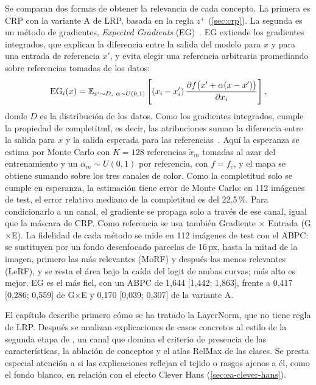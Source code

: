 Se comparan dos formas de obtener la relevancia de cada concepto. La primera es CRP con la variante A de LRP, basada en la regla $z^{+}$ (\cref{sec:crp}). La segunda es un método de gradientes, \emph{Expected Gradients} (EG)~\cite{erion2020}. EG extiende los gradientes integrados, que explican la diferencia entre la salida del modelo para $x$ y para una entrada de referencia $x'$, y evita elegir una referencia arbitraria promediando sobre referencias tomadas de los datos:
\begin{equation}\label{eq:eg}
  \mathrm{EG}_i(x) = \operatorname{\mathbb{E}}_{x' \sim D,\ \alpha \sim U(0,1)}\left[ (x_i - x'_i)\, \frac{\partial f\bigl(x' + \alpha (x - x')\bigr)}{\partial x_i} \right],
\end{equation}
donde $D$ es la distribución de los datos. Como los gradientes integrados, cumple la propiedad de completitud, es decir, las atribuciones suman la diferencia entre la salida para $x$ y la salida esperada para las referencias~\cite[sec.~2.2 y Methods~2]{erion2020}. Aquí la esperanza se estima por Monte Carlo con $K = 128$ referencias $\tilde x_m$ tomadas al azar del entrenamiento y un $\alpha_m \sim U(0, 1)$ por referencia, con $f = f_c$, y el mapa se obtiene sumando sobre los tres canales de color. Como la completitud solo se cumple en esperanza, la estimación tiene error de Monte Carlo: en 112 imágenes de test, el error relativo mediano de la completitud es del 22,5\,\%. Para condicionarlo a un canal, el gradiente se propaga solo a través de ese canal, igual que la máscara de CRP. Como referencia se usa también Gradiente $\times$ Entrada (G$\times$E). La fidelidad de cada método se mide en 112 imágenes de test con el ABPC: se sustituyen por un fondo desenfocado parcelas de 16\,px, hasta la mitad de la imagen, primero las más relevantes (MoRF) y después las menos relevantes (LeRF), y se resta el área bajo la caída del logit de ambas curvas; más alto es mejor. EG es el más fiel, con un ABPC de 1,644 [1,442; 1,863], frente a 0,417 [0,286; 0,559] de G$\times$E y 0,170 [0,039; 0,307] de la variante A.

El capítulo describe primero cómo se ha tratado la LayerNorm, que no tiene regla de LRP. Después se analizan explicaciones de casos concretos al estilo de la segunda etapa de \stoodx, un canal que domina el criterio de presencia de las características, la ablación de conceptos y el atlas RelMax de las clases. Se presta especial atención a si las explicaciones reflejan el tejido o rasgos ajenos a él, como el fondo blanco, en relación con el efecto Clever Hans (\cref{sec:ea-clever-hans}).

